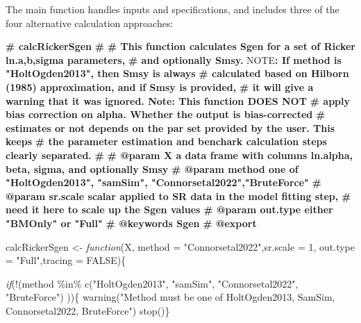 \documentclass[french,11pt]{book}
\newenvironment{Shaded}{\begin{snugshade}}{\end{snugshade}}
\newcommand{\AlertTok}[1]{\textcolor[rgb]{0.94,0.16,0.16}{#1}}
\newcommand{\AttributeTok}[1]{\textcolor[rgb]{0.77,0.63,0.00}{#1}}
\newcommand{\CommentTok}[1]{\textcolor[rgb]{0.56,0.35,0.01}{\textbf{#1}}}
\newcommand{\ConstantTok}[1]{\textcolor[rgb]{0.00,0.00,0.00}{#1}}
\newcommand{\ControlFlowTok}[1]{\textcolor[rgb]{0.13,0.29,0.53}{\textit{#1}}}
\newcommand{\DecValTok}[1]{\textcolor[rgb]{0.00,0.00,0.81}{#1}}
\newcommand{\FunctionTok}[1]{\textcolor[rgb]{0.00,0.00,0.00}{#1}}
\newcommand{\NormalTok}[1]{#1}
\newcommand{\OtherTok}[1]{\textcolor[rgb]{0.56,0.35,0.01}{#1}}
\newcommand{\SpecialCharTok}[1]{\textcolor[rgb]{0.00,0.00,0.00}{#1}}
\newcommand{\StringTok}[1]{\textcolor[rgb]{0.31,0.60,0.02}{#1}}
\begin{document}
The main function handles inputs and specifications, and includes three of the four alternative calculation approaches:
\begin{Shaded}
\begin{Highlighting}[]

\CommentTok{\#\textquotesingle{} calcRickerSgen}
\CommentTok{\#\textquotesingle{}}
\CommentTok{\#\textquotesingle{} This function calculates Sgen for a set of Ricker ln.a,b,sigma parameters, }
\CommentTok{\#\textquotesingle{} and optionally Smsy. }\AlertTok{NOTE}\CommentTok{: If method is "HoltOgden2013", then Smsy is always}
\CommentTok{\#\textquotesingle{}  calculated based on Hilborn (1985) approximation, and if Smsy is provided, }
\CommentTok{\#\textquotesingle{}  it will give a warning that it was ignored. Note: This function DOES NOT }
\CommentTok{\#\textquotesingle{}  apply bias correction on alpha. Whether the output is bias{-}corrected }
\CommentTok{\#\textquotesingle{}  estimates or not depends on the par set provided by the user. This keeps }
\CommentTok{\#\textquotesingle{}  the parameter estimation and benchark calculation steps clearly separated.}
\CommentTok{\#\textquotesingle{}}
\CommentTok{\#\textquotesingle{} @param X  a data frame with columns ln.alpha, beta, sigma, and optionally Smsy}
\CommentTok{\#\textquotesingle{} @param method  one of "HoltOgden2013", "samSim", "Connorsetal2022","BruteForce"}
\CommentTok{\#\textquotesingle{} @param sr.scale scalar applied to SR data in the model fitting step, }
\CommentTok{\#\textquotesingle{}                    need it here to scale up the Sgen values}
\CommentTok{\#\textquotesingle{} @param out.type either "BMOnly" or "Full"}
\CommentTok{\#\textquotesingle{} @keywords Sgen}
\CommentTok{\#\textquotesingle{} @export}

\NormalTok{calcRickerSgen }\OtherTok{\textless{}{-}} \ControlFlowTok{function}\NormalTok{(X, }\AttributeTok{method =} \StringTok{"Connorsetal2022"}\NormalTok{,}\AttributeTok{sr.scale =} \DecValTok{1}\NormalTok{, }
                               \AttributeTok{out.type =} \StringTok{"Full"}\NormalTok{,}\AttributeTok{tracing =} \ConstantTok{FALSE}\NormalTok{)\{}

\ControlFlowTok{if}\NormalTok{(}\SpecialCharTok{!}\NormalTok{(method }\SpecialCharTok{\%in\%} \FunctionTok{c}\NormalTok{(}\StringTok{"HoltOgden2013"}\NormalTok{, }\StringTok{"samSim"}\NormalTok{, }\StringTok{"Connorsetal2022"}\NormalTok{,}
                                     \StringTok{"BruteForce"}\NormalTok{) ))\{}
  \FunctionTok{warning}\NormalTok{(}\StringTok{"Method must be one of HoltOgden2013, SamSim, Connorsetal2022, }
\StringTok{                BruteForce"}\NormalTok{)}
  \FunctionTok{stop}\NormalTok{()\}}


\end{Highlighting}
\end{Shaded}
\end{document}

